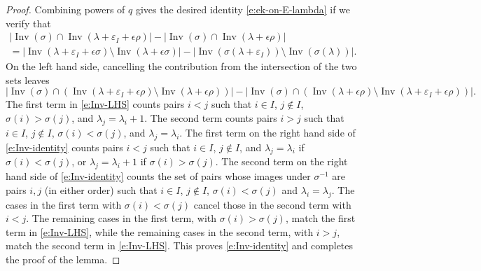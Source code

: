 \documentclass[12pt]{amsart}
\theoremstyle{definition}
\theoremstyle{remark}
\DeclareMathOperator{\Inv}{Inv}
\begin{document}
\begin{proof}
Combining powers of $q$ gives the desired identity
\eqref{e:ek-on-E-lambda} if we verify that
\begin{multline}\label{e:Inv-identity}
|\Inv (\sigma )\cap \Inv (\lambda +\varepsilon _{I} + \epsilon \rho )|
- |\Inv (\sigma )\cap \Inv (\lambda +\epsilon \rho )|\\
 = |\Inv (\lambda + \varepsilon _{I} + \epsilon \sigma )\setminus \Inv
(\lambda + \epsilon \sigma )| - |\Inv (\sigma (\lambda +\varepsilon
_{I}))\setminus \Inv (\sigma (\lambda ))|.
\end{multline}
On the left hand side, cancelling the contribution from the
intersection of the two sets leaves
\begin{equation}\label{e:Inv-LHS}
|\Inv (\sigma )\cap (\Inv (\lambda +\varepsilon _{I} + \epsilon \rho
)\setminus \Inv (\lambda + \epsilon \rho ))| - |\Inv (\sigma )\cap
(\Inv (\lambda +\epsilon \rho )\setminus \Inv (\lambda +\varepsilon
_{I} + \epsilon \rho ))|.
\end{equation}
The first term in \eqref{e:Inv-LHS} counts pairs $i<j$ such that $i\in
I$, $j\not \in I$, $\sigma (i)>\sigma (j)$, and $\lambda _{j} = \lambda
_{i}+1$.
The second term counts pairs $i>j$ such that $i\in I$, $j\not \in I$,
$\sigma (i)<\sigma (j)$, and $\lambda _{j} = \lambda _{i}$.
The first term on the right hand side of \eqref{e:Inv-identity} counts
pairs $i<j$ such that $i\in I$, $j\not \in I$, and $\lambda _{j} =
\lambda _{i}$ if $\sigma (i)<\sigma (j)$, or $\lambda _{j} = \lambda
_{i}+1$ if $\sigma (i)>\sigma (j)$.  The second term on the right hand
side of \eqref{e:Inv-identity} counts the set of pairs whose images
under $\sigma ^{-1}$ are pairs $i,j$ (in either order) such that $i\in
I$, $j\not \in I$, $\sigma (i)<\sigma (j)$ and $\lambda _{i} = \lambda
_{j}$.  The cases in the first term with $\sigma (i)<\sigma (j)$
cancel those in the second term with $i<j$.  The remaining cases in
the first term, with $\sigma (i)>\sigma (j)$, match the first term in
\eqref{e:Inv-LHS}, while the remaining cases in the second term, with
$i>j$, match the second term in \eqref{e:Inv-LHS}.  This proves
\eqref{e:Inv-identity} and completes the proof of the lemma.
\end{proof}
\end{document}
